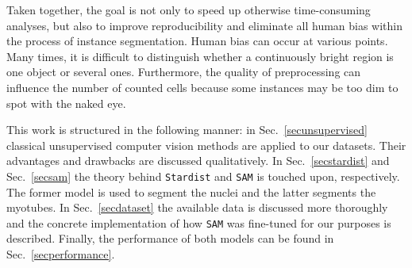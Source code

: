 Taken together, the goal is not only to speed up otherwise time-consuming analyses, but also to improve reproducibility and eliminate all human bias within the process of instance segmentation. Human bias can occur at various points. Many times, it is difficult to distinguish whether a continuously bright region is one object or several ones. Furthermore, the quality of preprocessing can influence the number of counted cells because some instances may be too dim to spot with the naked eye.

This work is structured in the following manner: in Sec.~\ref{secunsupervised} classical unsupervised computer vision methods are applied to our datasets. Their advantages and drawbacks are discussed qualitatively. In Sec.~\ref{secstardist} and Sec.~\ref{secsam} the theory behind \texttt{Stardist} and \texttt{SAM} is touched upon, respectively. The former model is used to segment the nuclei and the latter segments the myotubes. In Sec.~\ref{secdataset} the available data is discussed more thoroughly and the concrete implementation of how \texttt{SAM} was fine-tuned for our purposes is described. Finally, the performance of both models can be found in Sec.~\ref{secperformance}.

